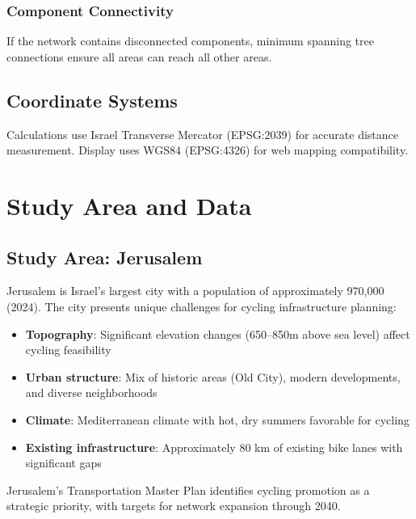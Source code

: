 \documentclass[12pt,a4paper]{article}
\begin{document}
\subsubsection{Component Connectivity}

If the network contains disconnected components, minimum spanning tree connections ensure all areas can reach all other areas.

\subsection{Coordinate Systems}

Calculations use Israel Transverse Mercator (EPSG:2039) for accurate distance measurement. Display uses WGS84 (EPSG:4326) for web mapping compatibility.

\section{Study Area and Data}
\label{sec:data}

\subsection{Study Area: Jerusalem}

Jerusalem is Israel's largest city with a population of approximately 970,000 (2024). The city presents unique challenges for cycling infrastructure planning:

\begin{itemize}
    \item \textbf{Topography}: Significant elevation changes (650--850m above sea level) affect cycling feasibility
    \item \textbf{Urban structure}: Mix of historic areas (Old City), modern developments, and diverse neighborhoods
    \item \textbf{Climate}: Mediterranean climate with hot, dry summers favorable for cycling
    \item \textbf{Existing infrastructure}: Approximately 80 km of existing bike lanes with significant gaps
\end{itemize}

Jerusalem's Transportation Master Plan identifies cycling promotion as a strategic priority, with targets for network expansion through 2040.
\end{document}
